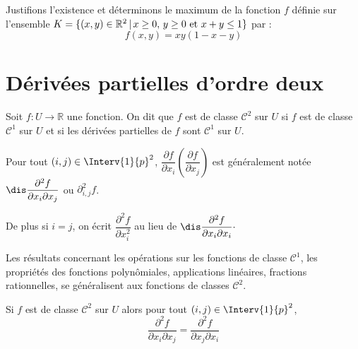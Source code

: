 \documentclass[a4paper,10pt]{report}
\begin{document}
\medskip

\begin{ex} Justifions l'existence et déterminons le maximum de la fonction $f$ définie sur l'ensemble $K=\lbrace (x,y) \in \mathbb{R}^2  \, \vert \, x \geq 0, \,  y \geq 0 \hbox{ et } x+y \leq 1\rbrace$ par : 
  \[
  f(x,y) = xy(1-x-y)
  \]





  
  \vspace{10cm}
\end{ex}

\newpage

\section{Dérivées partielles d'ordre deux}

\begin{defin} Soit $f : U \rightarrow \mathbb{R}$ une fonction. On dit que $f$ est de classe $\mathcal{C}^2$ sur $U$ si $f$ est de classe $\mathcal{C}^1$ sur $U$ et si les dérivées partielles de $f$ sont $\mathcal{C}^1$ sur $U$.
\end{defin}

\noindent Pour tout $(i,j) \in \Interv{1}{p}^2$, $\dfrac{\partial f}{\partial x_i} \left( \dfrac{\partial f}{\partial x_j} \right)$ est généralement notée $\dis \dfrac{\partial^2 f}{\partial x_i \partial x_j}$ ou $\partial^2_{i,j} f$.

\noindent De plus si $i=j$, on écrit $\dfrac{\partial^2 f}{\partial x_i^2}$ au lieu de $\dis \dfrac{\partial^2 f}{\partial x_i \partial x_i}\cdot$

\medskip


\begin{rem} Les résultats concernant les opérations sur les fonctions de classe $\mathcal{C}^1$, les propriétés des fonctions polynômiales, applications linéaires, fractions rationnelles, se généralisent aux fonctions de classes $\mathcal{C}^2$.
\end{rem}

\begin{thm}[Schwarz]
Si $f$ est de classe $\mathcal{C}^2$ sur $U$ alors pour tout $(i,j) \in \Interv{1}{p}^2$,
$$ \dfrac{\partial^2 f}{\partial x_i \partial x_j} = \dfrac{\partial^2 f}{\partial x_j \partial x_i}$$
\end{thm}
\end{document}
